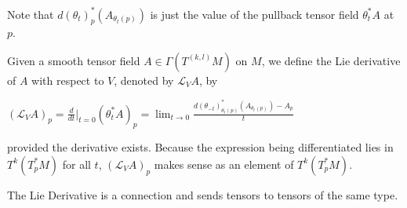 Note that \(d(\theta_t)_p^* (A_{\theta_t(p)})\) is just the value of the pullback tensor field \(\theta_t^* A\) at \(p\).

Given a smooth tensor field \(A \in \Gamma(T^{(k,l)}M)\) on \(M\), we define the Lie derivative of \(A\)
with respect to \(V\), denoted by \(\mathcal{L}_V A\), by

\((\mathcal{L}_V A)_p = \frac{d}{dt}\bigg|_{t=0} (\theta_t^* A)_p 
= \lim_{t \to 0} \frac{d(\theta_{-t})_{\theta_t(p)}^* (A_{\theta_t(p)}) - A_p}{t}\)

provided the derivative exists.
Because the expression being differentiated lies in \(T^k (T_p^* M)\) for all \(t\), 
\((\mathcal{L}_V A)_p\) makes sense as an element of \(T^k (T_p^* M)\).

The Lie Derivative is a connection and sends tensors to tensors of the same type.
